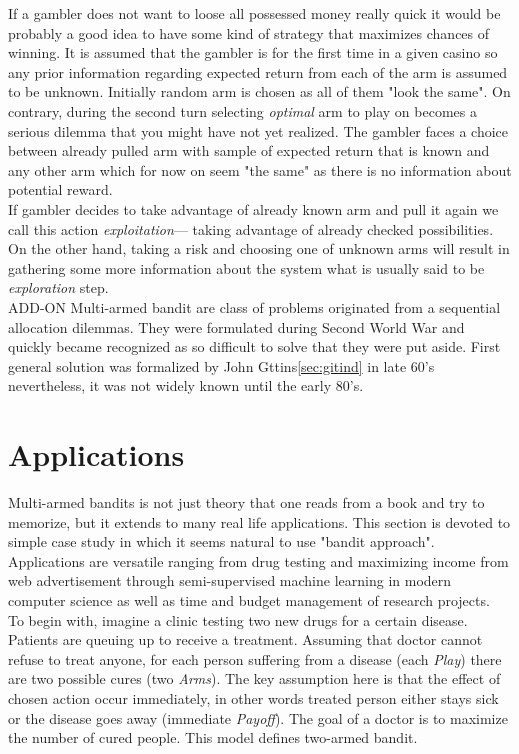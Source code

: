 \documentclass[12pt, a4paper, pdflatex, leqno]{report}
\begin{document}
If a gambler does not want to loose all possessed money really quick it would be probably a good idea to have some kind of strategy that maximizes chances of winning. It is assumed that the gambler is for the first time in a given casino so any prior information regarding expected return from each of the arm is assumed to be unknown. Initially random arm is chosen as all of them "look the same". On contrary, during the second turn selecting \emph{optimal} arm to play on becomes a serious dilemma that you might have not yet realized. The gambler faces a choice between already pulled arm with sample of expected return that is known and any other arm which for now on seem "the same" as there is no information about potential reward.\\
If gambler decides to take advantage of already known arm and pull it again we call this action \emph{exploitation}--- taking advantage of already checked possibilities. On the other hand, taking a risk and choosing one of unknown arms will result in gathering some more information about the system what is usually said to be \emph{exploration} step.\\

ADD-ON
Multi-armed bandit are class of problems originated from a sequential allocation dilemmas. They were formulated during Second World War and quickly became recognized as so difficult to solve that they were put aside. First general solution was formalized by John Gttins\ref{sec:gitind} in late 60's nevertheless, it was not widely known until the early 80's.~\citep{gittins+glazebrook+weber}


\section{Applications} %
Multi-armed bandits is not just theory that one reads from a book and try to memorize, but it extends to many real life applications. This section is devoted to simple case study in which it seems natural to use "bandit approach". Applications are versatile ranging from drug testing and maximizing income from web advertisement through semi-supervised machine learning in modern computer science as well as time and budget management of research projects.\\

To begin with, imagine a clinic testing two new drugs for a certain disease. Patients are queuing up to receive a treatment. Assuming that doctor cannot refuse to treat anyone, for each person suffering from a disease (each \emph{Play}) there are two possible cures (two \emph{Arms}). The key assumption here is that the effect of chosen action occur immediately, in other words treated person either stays sick or the disease goes away (immediate \emph{Payoff}). The goal of a doctor is to maximize the number of cured people. This model defines two-armed bandit.\\
\end{document}
